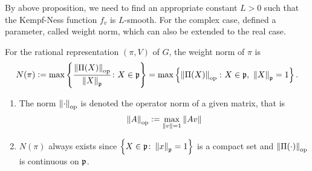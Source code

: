 \documentclass[suri,pdfbookmark]{engsuribt} %
\begin{document}
  By above proposition, we need to find an appropriate constant $L>0$ such that the Kempf-Ness function $f_v$ is $L$-smooth. For the complex case, \cite{key8} defined a parameter, called weight norm, which can also be extended to the real case.

  \begin{defn}
    For the rational representation $(\pi,V)$ of $G$, the weight norm of $\pi$ is
    \begin{equation*}
      N(\pi) \vcentcolon= \max\left\{\frac{\left\lVert\Pi(X)\right\lVert_{\operatorname{op}}}{\left\lVert X\right\lVert_{\mathfrak{p}}} \colon X \in \mathfrak{p}\right\} = \max\left\{\left\lVert\Pi(X)\right\lVert_{\operatorname{op}} \colon X \in \mathfrak{p},~\left\lVert X\right\lVert_{\mathfrak{p}}=1\right\}.
    \end{equation*}
  \end{defn}
  \begin{rem}
    \begin{enumerate}[label=(\arabic*)]
      \item The norm $\left\lVert\cdot\right\lVert_{\operatorname{op}}$ is denoted the operator norm of a given matrix, that is
      \begin{equation*}
        \left\lVert A\right\lVert_{\operatorname{op}} \vcentcolon= \max_{\left\lVert v\right\lVert=1} \left\lVert Av\right\lVert
      \end{equation*}
      \item $N(\pi)$ always exists since $\left\{X \in \mathfrak{p} \colon \left\lVert x\right\lVert_{\mathfrak{p}}=1\right\}$ is a compact set and $\left\lVert\Pi(\cdot)\right\lVert_{\operatorname{op}}$ is continuous on $\mathfrak{p}$.
    \end{enumerate}
  \end{rem}
\end{document}
